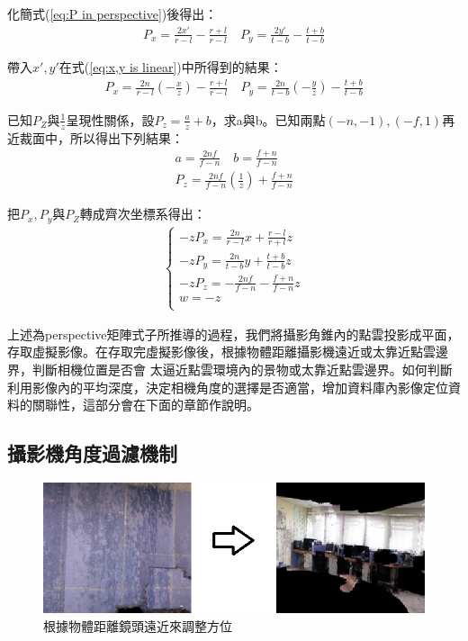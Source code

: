 	化簡式(\ref{eq:P in perspective})後得出：
	\begin{align}
		P_x = \frac{2x'}{r-l} - \frac{r+l}{r-l} \quad   P_y = \frac{2y'}{t-b} - \frac{t+b}{t-b}
	\end{align}
	
	帶入$x',y'$在式(\ref{eq:x,y is linear})中所得到的結果：
	\begin{align}
		P_x = \frac{2n}{r-l} (-\frac{x}{z}) - \frac{r+l}{r-l} 	\quad	P_y = \frac{2n}{t-b} (-\frac{y}{z}) - \frac{t+b}{t-b} 
	\end{align}
	
	已知$P_Z$與$\frac{1}{z} $呈現性關係，設$P_z = \frac{a}{z}+b$，求a與b。已知兩點$(-n,-1),(-f,1)$再近裁面中，所以得出下列結果：
	\begin{align}
		a = \frac{2nf}{f-n} \quad b = \frac{f+n}{f-n} \\
		P_z = \frac{2nf}{f-n}(\frac{1}{z}) + \frac{f+n}{f-n} 
	\end{align}
	
	把$P_x, P_y$與$P_Z$轉成齊次坐標系得出：
	\begin{align}
		\left\{
		\begin{array}{ccc}
		-zP_x = \frac{2n}{r-l}x + \frac{r-l}{r+l}z  \\
		-zP_y = \frac{2n}{t-b}y + \frac{t+b}{t-b}z  \\
		-zP_z = -\frac{2nf}{f-n} - \frac{f+n}{f-n}z \\
		w = -z\\
		\end{array}
		\right.
	\end{align}
	
	上述為perspective矩陣式子所推導的過程，我們將攝影角錐內的點雲投影成平面，存取虛擬影像。在存取完虛擬影像後，根據物體距離攝影機遠近或太靠近點雲邊界，判斷相機位置是否會
	太逼近點雲環境內的景物或太靠近點雲邊界。如何判斷利用影像內的平均深度，決定相機角度的選擇是否適當，增加資料庫內影像定位資料的關聯性，這部分會在下面的章節作說明。
	
\subsection{攝影機角度過濾機制}
%

	\begin{figure}
	\begin{center}
	  \includegraphics[width=1.0\textwidth]{figures/Depth_Filter.jpg}
	  \caption{根據物體距離鏡頭遠近來調整方位}
	  \label{fig:Depth_Filter}
	\end{center}
	\end{figure}

